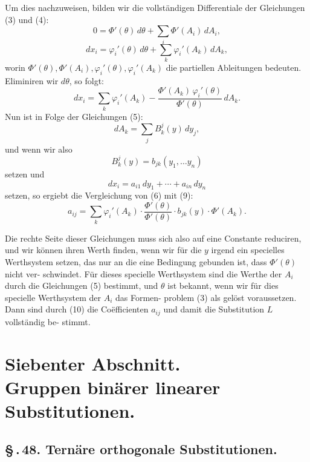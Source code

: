 \documentclass[12pt,a4paper]{article}
\theoremstyle{plain}
\theoremstyle{definition}
\theoremstyle{remark}
\newcommand{\sect}[1]{\S\,.\,#1.}
\begin{document}
Um dies nachzuweisen, bilden wir die vollst\"andigen Differentiale
der Gleichungen (3) und (4):
\[
0 = \Phi'(\theta)\,d\theta + \sum_i \Phi'(A_i)\,dA_i,
\]
\[
dx_i = \varphi_i'(\theta)\,d\theta + \sum_k \varphi_i'(A_k)\,dA_k,
\]
worin $\Phi'(\theta), \Phi'(A_i), \varphi_i'(\theta), \varphi_i'(A_k)$ die partiellen Ableitungen
bedeuten. Eliminiren wir $d\theta$, so folgt:
\begin{equation}\label{eq:47_6}
dx_i = \sum_k \varphi_i'(A_k) - \frac{\Phi'(A_k)\,\varphi_i'(\theta)}{\Phi'(\theta)}\,dA_k.\tag{6}
\end{equation}
Nun ist in Folge der Gleichungen (5):
\begin{equation}\label{eq:47_7}
dA_k = \sum_j B_k^j(y)\,dy_j,\tag{7}
\end{equation}
und wenn wir also
\begin{equation}\label{eq:47_8}
B_k^j(y) = b_{jk}(y_1, \ldots y_n)\tag{8}
\end{equation}
setzen und
\begin{equation}\label{eq:47_9}
dx_i = a_{i1}\,dy_1 + \cdots + a_{in}\,dy_n\tag{9}
\end{equation}
setzen, so ergiebt die Vergleichung von (6) mit (9):
\begin{equation}\label{eq:47_10}
a_{ij} = \sum_k \varphi_i'(A_k) \cdot \frac{\Phi'(\theta)}{\Phi'(\theta)} \cdot b_{jk}(y) \cdot \Phi'(A_k).\tag{10}
\end{equation}

Die rechte Seite dieser Gleichungen muss sich also auf eine
Constante reduciren, und wir k\"onnen ihren Werth finden, wenn
wir f\"ur die $y$ irgend ein specielles Werthsystem setzen, das nur
an die eine Bedingung gebunden ist, dass $\Phi'(\theta)$ nicht ver-
schwindet. F\"ur dieses specielle Werthsystem sind die Werthe
der $A_i$ durch die Gleichungen (5) bestimmt, und $\theta$ ist bekannt,
wenn wir f\"ur dies specielle Werthsystem der $A_i$ das Formen-
problem (3) als gel\"ost voraussetzen. Dann sind durch (10) die
Co\"efficienten $a_{ij}$ und damit die Substitution $L$ vollst\"andig be-
stimmt.


\section*{Siebenter Abschnitt.\\[-0.3em] Gruppen bin\"arer linearer Substitutionen.}

\subsection*{\sect{48} Tern\"are orthogonale Substitutionen.}
\end{document}
